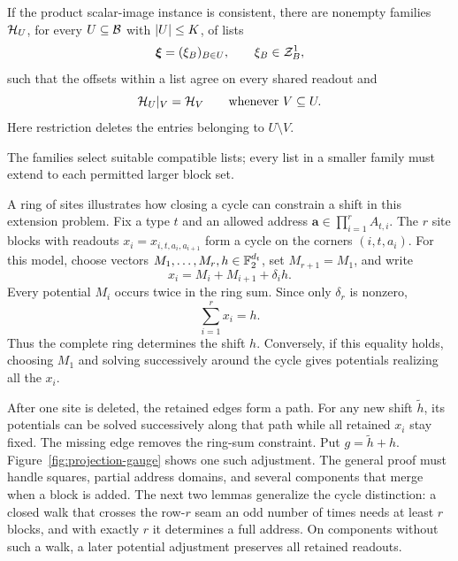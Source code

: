 \begin{proposition}
\label{prop:exact-projection}
If the product scalar-image instance is consistent, there are nonempty
families \(\mathcal H_U\), for every \(U\subseteq\mathcal B\) with \(\lvert U\rvert\le K\),
of lists
\[
  \boldsymbol\xi=(\xi_B)_{B\in U},\qquad \xi_B\in\mathcal Z_B^1,
\]
such that the offsets within a list agree on every shared readout and
\begin{equation}
       \mathcal H_U|_V=\mathcal H_V
       \qquad\text{whenever }V\subseteq U.
       \label{eq:exact-projection}
\end{equation}
Here restriction deletes the entries belonging to \(U\setminus V\).
\end{proposition}

The families select suitable compatible lists; every list in a smaller
family must extend to each permitted larger block set.

A ring of sites illustrates how closing a cycle can constrain a shift
in this extension problem. Fix a type \(t\) and an allowed address
\(\mathbf a\in\prod_{i=1}^r A_{t,i}\). The \(r\) site blocks with
readouts \(x_i=x_{i,t,a_i,a_{i+1}}\) form a cycle on the corners
\((i,t,a_i)\). For this model, choose vectors
\(M_1,\ldots,M_r,h\in\mathbb F_2^{d_t}\), set \(M_{r+1}=M_1\), and write
\[
             x_i=M_i+M_{i+1}+\delta_i h.
\]
Every potential \(M_i\) occurs twice in the ring sum. Since only
\(\delta_r\) is nonzero,
\[
                         \sum_{i=1}^r x_i=h.
\]
Thus the complete ring determines the shift \(h\). Conversely, if
this equality holds, choosing \(M_1\) and solving successively around
the cycle gives potentials realizing all the \(x_i\).

After one site is deleted, the retained edges form a path. For any
new shift \(\widetilde h\), its potentials can be solved successively
along that path while all retained \(x_i\) stay fixed. The missing
edge removes the ring-sum constraint. Put \(g=\widetilde h+h\).
Figure~\ref{fig:projection-gauge} shows one such adjustment.
The general proof must handle squares,
partial address domains, and several components that merge when a
block is added. The next two lemmas generalize the cycle distinction:
a closed walk that crosses the row-\(r\) seam an odd number of times
needs at least \(r\) blocks, and with exactly \(r\) it determines a
full address. On components without such a walk, a later potential
adjustment preserves all retained readouts.



